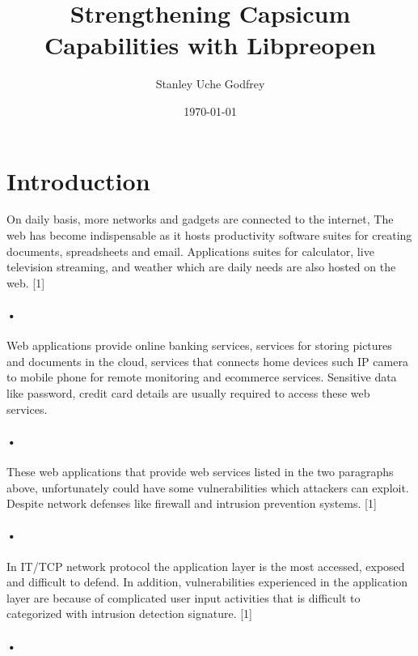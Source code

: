 \documentclass{article}
\title{Strengthening Capsicum Capabilities with Libpreopen}
\author{Stanley Uche Godfrey}
\date{\today}
\begin{document}
 
\maketitle
 
\section{Introduction}
 
On daily basis, more networks and gadgets are connected to the internet, The web has become 
indispensable as it hosts productivity software suites for creating documents, spreadsheets
and email. Applications suites for calculator, live television streaming, and weather which 
are daily needs are also hosted on the web. [1]\paragraph*{•}



Web applications provide online banking services, services for storing pictures and documents
in the cloud, services that connects home devices such IP camera to mobile phone for remote 
monitoring and ecommerce services. Sensitive data like password, credit card details are usually 
required to access these web services.\paragraph*{•}



These web applications that provide web services listed in the two paragraphs above, unfortunately
could have some vulnerabilities which attackers can exploit. Despite network defenses like firewall
and intrusion prevention systems. [1]\paragraph*{•}



In IT/TCP network protocol the application layer is the most accessed, exposed and difficult to defend.
In addition, vulnerabilities experienced in the application layer are because of complicated user input 
activities that is difficult to categorized with intrusion detection signature. [1]\paragraph*{•}
\end{document}
